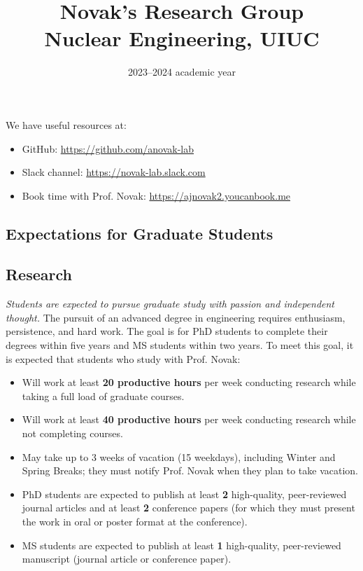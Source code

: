 \documentclass[12pt,twoside]{article}
\date{2023--2024 academic year}
\title{Novak's Research Group \\ Nuclear Engineering, UIUC}
\begin{document}
\maketitle

We have useful resources at:
\begin{itemize}
\item GitHub: \url{https://github.com/anovak-lab}
\item Slack channel: \url{https://novak-lab.slack.com}
\item Book time with Prof. Novak: \url{https://ajnovak2.youcanbook.me}
\end{itemize}

\begin{center}
\section*{Expectations for Graduate Students}
\end{center}

\subsection*{Research}

\textit{Students are expected to pursue graduate study with passion and independent thought.} The pursuit of an advanced degree in engineering requires enthusiasm, persistence, and hard work. The goal is for PhD students to complete their degrees within five years and MS students within two years. To meet this goal, it is expected that students who study with Prof. Novak:
%
\begin{itemize}
\item Will work at least \textbf{20 productive hours} per week conducting research while taking a full load of graduate courses.
\item Will work at least \textbf{40 productive hours} per week conducting research while not completing courses.
\item May take up to 3 weeks of vacation (15 weekdays), including Winter and Spring Breaks; they must notify Prof. Novak when they plan to take vacation.
\item PhD students are expected to publish at least \textbf{2} high-quality, peer-reviewed journal articles and at least \textbf{2} conference papers (for which they must present the work in oral or poster format at the conference).
\item MS students are expected to publish at least \textbf{1} high-quality, peer-reviewed manuscript (journal article or conference paper).
\end{itemize}
\end{document}
